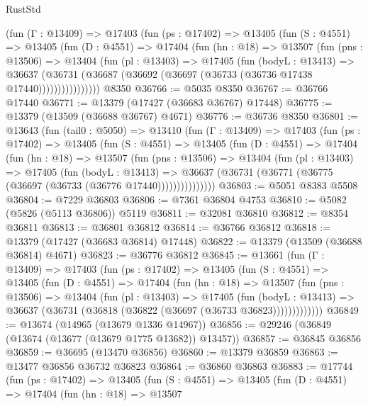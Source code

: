 \begin{lexlean}{RustStd}
\begin{coremodule}
        (fun (Γ : @13409) =>
        @17403
          (fun (ps : @17402) =>
          @13405
            (fun (S : @4551) =>
            @13405
              (fun (D : @4551) =>
              @17404
                (fun (hn : @18) =>
                @13507
                  (fun (pns : @13506) =>
                  @13404
                    (fun (pl : @13403) =>
                    @17405
                      (fun (bodyL : @13413) =>
                      @36637
                        (@36731
                          (@36687 (@36692 (@36697 (@36733 (@36736 @17438 @17440))))))))))))))))
    @8350
@36766 := @5035 @8350
@36767 := @36766 @17440
@36771 := @13379 (@17427 (@36683 @36767) @17448)
@36775 := @13379 (@13509 (@36688 @36767) @4671)
@36776 := @36736 @8350
@36801 := @13643
    (fun (tail0 : @5050) =>
    @13410
      (fun (Γ : @13409) =>
      @17403
        (fun (ps : @17402) =>
        @13405
          (fun (S : @4551) =>
          @13405
            (fun (D : @4551) =>
            @17404
              (fun (hn : @18) =>
              @13507
                (fun (pns : @13506) =>
                @13404
                  (fun (pl : @13403) =>
                  @17405
                    (fun (bodyL : @13413) =>
                    @36637 (@36731 (@36771 (@36775 (@36697 (@36733 (@36776 @17440)))))))))))))))
@36803 := @5051 @8383 @5508
@36804 := @7229 @36803
@36806 := @7361 @36804 @4753
@36810 := @5082 (@5826 (@5113 @36806)) @5119
@36811 := @32081 @36810
@36812 := @8354 @36811
@36813 := @36801 @36812
@36814 := @36766 @36812
@36818 := @13379 (@17427 (@36683 @36814) @17448)
@36822 := @13379 (@13509 (@36688 @36814) @4671)
@36823 := @36776 @36812
@36845 := @13661
    (fun (Γ : @13409) =>
    @17403
      (fun (ps : @17402) =>
      @13405
        (fun (S : @4551) =>
        @13405
          (fun (D : @4551) =>
          @17404
            (fun (hn : @18) =>
            @13507
              (fun (pns : @13506) =>
              @13404
                (fun (pl : @13403) =>
                @17405
                  (fun (bodyL : @13413) =>
                  @36637 (@36731 (@36818 (@36822 (@36697 (@36733 @36823)))))))))))))
@36849 := @13674 (@14965 (@13679 @1336 @14967))
@36856 := @29246 (@36849 (@13674 (@13677 (@13679 @1775 @13682)) @13457))
@36857 := @36845 @36856
@36859 := @36695 (@13470 @36856)
@36860 := @13379 @36859
@36863 := @13477 @36856 @36732 @36823
@36864 := @36860 @36863
@36883 := @17744
    (fun (ps : @17402) =>
    @13405
      (fun (S : @4551) =>
      @13405
        (fun (D : @4551) =>
        @17404
          (fun (hn : @18) =>
          @13507

\end{coremodule}
\end{lexlean}
